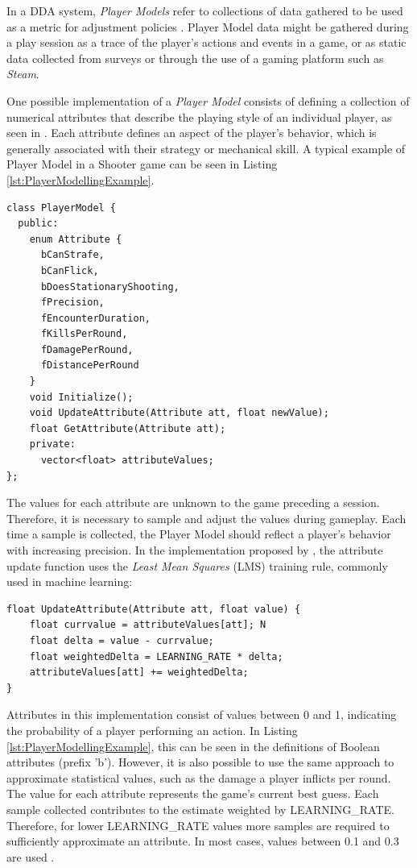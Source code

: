 In a DDA system, \emph{Player Models} refer to collections of data gathered to be used as a metric for adjustment policies \cite{PHD_DynamicDifficultyAdjustment}. Player Model data might be gathered during a play session as a trace of the player's actions and events in a game, or as static data collected from surveys or through the use of a gaming platform such as \emph{Steam}.

One possible implementation of a \emph{Player Model} consists of defining a collection of numerical attributes that describe the playing style of an individual player, as seen in \cite{BOOK_PlayerModeling}. Each attribute defines an aspect of the player's behavior, which is generally associated with their strategy or mechanical skill. A typical example of Player Model in a Shooter game can be seen in Listing \ref{lst:PlayerModellingExample}.

\begin{lstlisting}[caption={Example of a Player Model for a shooter game.},label={lst:PlayerModellingExample}]
class PlayerModel {
  public:
    enum Attribute {
      bCanStrafe,
      bCanFlick,
      bDoesStationaryShooting,
      fPrecision,
      fEncounterDuration,
      fKillsPerRound,
      fDamagePerRound,
      fDistancePerRound
    }
    void Initialize();
    void UpdateAttribute(Attribute att, float newValue);
    float GetAttribute(Attribute att);
    private:
      vector<float> attributeValues;
};
\end{lstlisting}

The values for each attribute are unknown to the game preceding a session. Therefore, it is necessary to sample and adjust the values during gameplay. Each time a sample is collected, the Player Model should reflect a player's behavior with increasing precision. In the implementation proposed by \citet{BOOK_PlayerModeling}, the attribute update function uses the \emph{Least Mean Squares} (LMS) training rule, commonly used in machine learning:

\begin{lstlisting}[caption={Implementation of attribute update using least mean squares.},label={lst:AttributeUpdate}]
float UpdateAttribute(Attribute att, float value) {
    float currvalue = attributeValues[att]; N
    float delta = value - currvalue;
    float weightedDelta = LEARNING_RATE * delta;
    attributeValues[att] += weightedDelta;
}
\end{lstlisting}

Attributes in this implementation consist of values between 0 and 1, indicating the probability of a player performing an action. In Listing \ref{lst:PlayerModellingExample}, this can be seen in the definitions of Boolean attributes (prefix 'b'). However, it is also possible to use the same approach to approximate statistical values, such as the damage a player inflicts per round. The value for each attribute represents the game's current best guess. Each sample collected contributes to the estimate weighted by LEARNING\_RATE. Therefore, for lower LEARNING\_RATE values more samples are required to sufficiently approximate an attribute. In most cases, values between 0.1 and 0.3 are used \cite{BOOK_PlayerModeling}.

